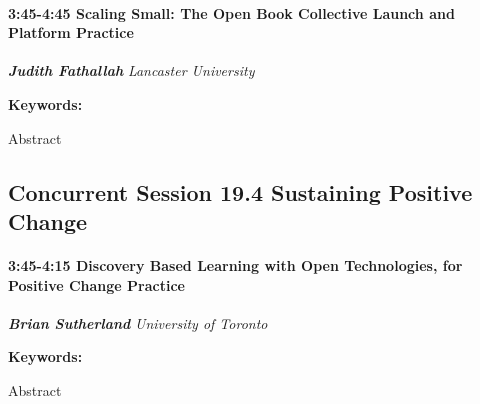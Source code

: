 \documentclass[
]{book}
\begin{document}
\begin{session}
\hypertarget{scaling-small-the-open-book-collective-launch-and-platform-practice}{%
\paragraph*{\texorpdfstring{3:45-4:45 \textbar{} \textbf{Scaling Small:
The Open Book Collective Launch and Platform} \textbar{}
Practice}{3:45-4:45 \textbar{} Scaling Small: The Open Book Collective Launch and Platform \textbar{} Practice}}\label{scaling-small-the-open-book-collective-launch-and-platform-practice}}

\textbf{\emph{Judith Fathallah}} \textbar{} \emph{Lancaster University}

\textbf{Keywords:}

Abstract
\end{session}

\hypertarget{concurrent-session-19.4-sustaining-positive-change}{%
\subsection*{Concurrent Session 19.4 \textbar{} Sustaining Positive Change}\label{concurrent-session-19.4-sustaining-positive-change}}

\begin{session}
\hypertarget{discovery-based-learning-with-open-technologies-for-positive-change-practice}{%
\paragraph*{\texorpdfstring{3:45-4:15 \textbar{} \textbf{Discovery Based
Learning with Open Technologies, for Positive Change} \textbar{}
Practice}{3:45-4:15 \textbar{} Discovery Based Learning with Open Technologies, for Positive Change \textbar{} Practice}}\label{discovery-based-learning-with-open-technologies-for-positive-change-practice}}

\textbf{\emph{Brian Sutherland}} \textbar{} \emph{University of Toronto}

\textbf{Keywords:}

Abstract
\end{session}
\end{document}
